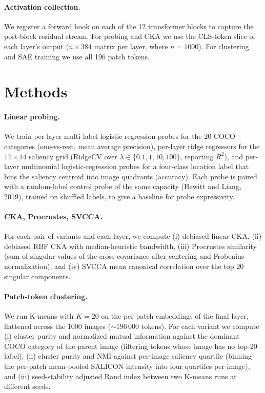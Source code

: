 \documentclass{article}
\begin{document}
\paragraph{Activation collection.}
We register a forward hook on each of the 12 transformer blocks to capture the post-block residual stream. For probing and CKA we use the CLS-token slice of each layer's output ($n \times 384$ matrix per layer, where $n = 1000$). For clustering and SAE training we use all 196 patch tokens.

\section{Methods}

\paragraph{Linear probing.}
We train per-layer multi-label logistic-regression probes for the 20 COCO categories (one-vs-rest, mean average precision), per-layer ridge regressors for the $14 \times 14$ saliency grid (RidgeCV over $\lambda \in \{0.1, 1, 10, 100\}$, reporting $R^2$), and per-layer multinomial logistic-regression probes for a four-class location label that bins the saliency centroid into image quadrants (accuracy). Each probe is paired with a random-label control probe of the same capacity (Hewitt and Liang, 2019), trained on shuffled labels, to give a baseline for probe expressivity.

\paragraph{CKA, Procrustes, SVCCA.}
For each pair of variants and each layer, we compute (i) debiased linear CKA, (ii) debiased RBF CKA with median-heuristic bandwidth, (iii) Procrustes similarity (sum of singular values of the cross-covariance after centering and Frobenius normalization), and (iv) SVCCA mean canonical correlation over the top 20 singular components.

\paragraph{Patch-token clustering.}
We run K-means with $K = 20$ on the per-patch embeddings of the final layer, flattened across the 1000 images ($\sim 196\,000$ tokens). For each variant we compute (i) cluster purity and normalized mutual information against the dominant COCO category of the parent image (filtering tokens whose image has no top-20 label), (ii) cluster purity and NMI against per-image saliency quartile (binning the per-patch mean-pooled SALICON intensity into four quartiles per image), and (iii) seed-stability adjusted Rand index between two K-means runs at different seeds.
\end{document}
